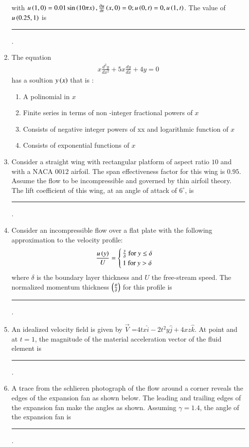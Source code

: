 \documentclass[journal]{IEEEtran}
\begin{document}
\begin{enumerate}
\begin{align*}
       \end{align*}
       with $u\left(1,0\right)=0.01\sin \left(10\pi x\right), \frac{\partial u}{\partial t}\left(x,0\right)=0; u\left(0,t\right)=0, u\left(1,t\right)$. The value of $u\left(0.25,1\right)$ is \rule{1cm}{0.15mm} .
	\item  The equation \begin{align*}
	    x\frac{d^2y}{dx^2}+5x\frac{dy}{dx}+4y=0
	\end{align*}
        has a soultion $y\left(x\right)$ that is :
		\begin{enumerate}
			\item A polinomial in $x$
			\item Finite series in terms of non -integer fractional powers of $x$
			\item Consists of negative integer powers of xx and logarithmic function of $x$
	        \item Consists of exponential functions of $x$
        	\end{enumerate}
	\item Consider a straight wing with rectangular platform of aspect ratio $10$ and with a NACA $0012$ airfoil. The span effectiveness factor for this wing is $0.95$. Assume the flow to be incompressible and governed by thin airfoil theory. The lift coefficient of this wing, at an angle of attack of $6^\circ$, is \rule{1cm}{0.15mm} .
	\item Consider an incompressible flow over a flat plate with the following approximation to the velocity profile:
 \begin{align*}
     \frac{u\left(y\right)}{U}=\begin{cases}
         \frac{y}{\delta} \text{ for } y\leq \delta \\
1 \text{ for } y> \delta
     \end{cases}
 \end{align*}
 where $\delta$ is the boundary layer thickness and $U$ the free-stream speed. The normalized momentum thickness $\left(\frac{\theta}{\delta}\right)$ for this profile is \rule{1cm}{0.15mm} .
	\item An idealized velocity field is given by $\Vec{V}$ =$4tx\hat{i}-2t^2y\hat{j}+4xz\hat{k}$. At point  and at $t=1$, the magnitude of the material acceleration vector of the fluid element is \rule{1cm}{0.15mm}.
	\item A trace from the schlieren photograph of the flow around a corner reveals the edges of the expansion fan as shown below. The leading and trailing edges of the expansion fan make the angles as shown. Assuming $\gamma=1.4$, the angle of the expansion fan  is  \rule{1cm}{0.15mm} .\\

\end{enumerate}
\end{document}
